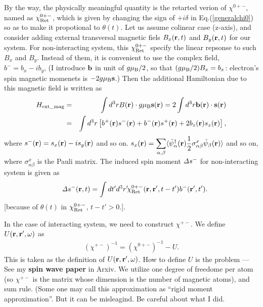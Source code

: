 \documentclass[a4paper,10pt,epsf,fleqn]{article}
\newcommand{\bfr}{{\bf r}}
\newcommand{\ds}{\displaystyle}
\newcommand{\D}{{\it \Delta}}
\newcommand{\req}[1]{Eq.(\ref{#1})}
\begin{document}
By the way, the physically meaningful quantity is the retarted verion of $\chi^{0+-}$,
named as $\chi^{0+-}_{\rm Ret}$, which is given by changing the sign of $+ i \delta$ in \req{generalchi0}
so as to make it propotional to $\theta(t)$.
Let us assume colinear case (z-axis), 
and consider adding external transversal magnetic fiels $B_x(\bfr,t)$ and $B_y(\bfr,t)$ 
for our system. For non-interacting system, this $\chi^{0+-}_{\rm Ret}$ 
specify the linear repsonse to such $B_x$ and $B_y$.
Instead of them, it is convenient to use the complex field, $b^- = b_x -i b_y$,
(I introduce ${\bf b}$ in unit of 
$g \mu_{\rm B}/2$, so that $(g \mu_{\rm B}/2) B_x =  b_x$:
electron's spin magnetic momenets is $-2 g \mu_{\rm B} {\bf s}$.)
Then the additional Hamiltonian due to this magnetic field is written
as 
\begin{eqnarray}
H_{\rm ext\_mag} 
&=&  \int d^3r B(\bfr) \cdot g \mu_{\rm B} {\bf s}(\bfr)
=  2 \int d^3r {\bf b}(\bfr) \cdot {\bf s} (\bfr) \nonumber \\
&=&  \int d^3r \left[ b^+(\bfr) s^-(\bfr) + b^-(\bfr)s^+(\bfr) 
+ 2 b_z(\bfr) s_z(\bfr) \right],
\end{eqnarray}
where $s^-(\bfr) = s_x(\bfr)- i s_y(\bfr)$ and so on.
$\ds s_x(\bfr) = \sum_{\alpha,\beta} 
\langle \hat{\psi}^\dagger_\alpha(\bfr) \frac{1}{2} \sigma^x_{\alpha \beta}
\hat{\psi}_{\beta}(\bfr) \rangle $
and so on, where $\sigma^x_{\alpha \beta}$ is the Pauli matrix.
The induced spin moment $\D s^-$ for non-interacting system is given as
\begin{eqnarray}
&& \D s^-(\bfr,t) = \int dt' d^3r' \! \chi^{0+-}_{\rm Ret}(\bfr,\bfr',t-t') b^-(\bfr',t').
\end{eqnarray}
[because of $\theta(t)$ in  $\chi^{0+-}_{\rm Ret}$, $t-t'>0$.].

In the case of interacting system, we need to construct $\chi^{+-}$.
We define ${U}(\bfr,\bfr',\omega)$ as
\begin{eqnarray}
(\chi^{+-})^{-1} =  \left(\chi^{0+-}\right)^{-1} - {U}.
\label{chirpa0}
\end{eqnarray}
This is taken as the definition of ${U}(\bfr,\bfr',\omega)$.
How to define $U$ is the problem --- See my {\bf spin wave paper} in Arxiv.
We utilize one degree of freedome per atom (so $\chi^{+-}$ is 
the matrix whose dimension is the number of magnetic atoms), and sum rule.
(Some one may call this approximation as ``rigid moment approximation''.
 But it can be misleagind. Be careful about what I did.
\end{document}
